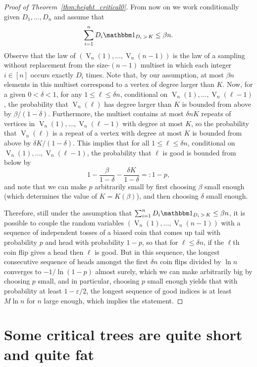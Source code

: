 \documentclass[10pt]{amsart}
\theoremstyle{definition}\newtheorem{defi}[theo]{Definition}\newtheorem{rema}[theo]{Remark}\newtheorem{exam}[theo]{Example}\newtheorem{exem}[theo]{Example}\newtheorem{nota}[theo]{Notation}
\DeclareMathOperator{\rseq}{V}
\newcommand{\I}[1]{{\mathbbm 1}_{#1}}
\begin{document}
\begin{proof}[Proof of Theorem~\ref{thm:height_critical0}]
From now on we work conditionally given $D_1,\dots, D_n$ and assume that
\[
\sum_{i=1}^n D_i\I{D_i\,>\,K}\leq \beta n.
\]
Observe that {the law of} $(\rseq_n(1),\dots, \rseq_n(n-1))$ is {the law of a} sampling without replacement from the size-$(n-1)$ multiset in which each integer $i\in [n]$ occurs exactly $D_i$ times. Note that, by our assumption, at most $\beta n$ elements in this multiset correspond to a vertex of degree larger than $K$. Now, for a given $0<\delta<1$, for any $1\leq \ell \leq \delta n$, conditional on $\rseq_n(1),\dots, \rseq_n(\ell-1)$, the probability that $\rseq_n(\ell)$ has degree larger than $K$ is bounded from above by $\beta/(1-\delta)$. Furthermore, the multiset contains at most $\delta n K$ repeats of vertices in $\rseq_n(1),\dots, \rseq_n(\ell-1)$ with degree at most $K$, so the probability that $\rseq_n(\ell)$ is a repeat of a vertex with degree at most $K$ is bounded from above by $\delta K/(1-\delta)$. This implies that for all $1 \le \ell \le \delta n$, conditional on $\rseq_n(1),\dots, \rseq_n(\ell-1)$, the probability that $\ell$ is good is bounded from below by
\[
1-\frac{\beta}{1-\delta} -\frac{\delta K}{1-\delta} =:1-p,
\]
and note that we can make $p$ arbitrarily small by first choosing $\beta$ small enough (which determines the value of $K=K(\beta)$), and then choosing $\delta$ small enough.

Therefore, still under the assumption that $\sum_{i=1}^n D_i\I{D_i\,>\,K}\leq \beta n$, it is possible to couple the random variables ${(\rseq_n(1),\dots, \rseq_n(n-1))}$ with a sequence of independent tosses of a biased coin that comes up tail with probability $p$ and head with probability $1-p$, so that for $\ell\leq \delta n$, {if the $\ell$th coin flip gives a head then $\ell$ is good.} But in this sequence, the longest consecutive sequence of heads amongst the first $\delta n$ coin flips divided by $\ln n$ converges to $-1/\ln(1-p)$ almost surely, which we can make arbitrarily big by choosing $p$ small, and in particular, choosing $p$ small enough yields that with probability at least $1-\varepsilon/2$, the longest sequence of good indices is at least $M\ln n$ for $n$ large enough, which implies the statement.
\end{proof}

\section{Some critical trees are quite short and quite fat}\label{sec:quite_short_quite_fat}
\end{document}
